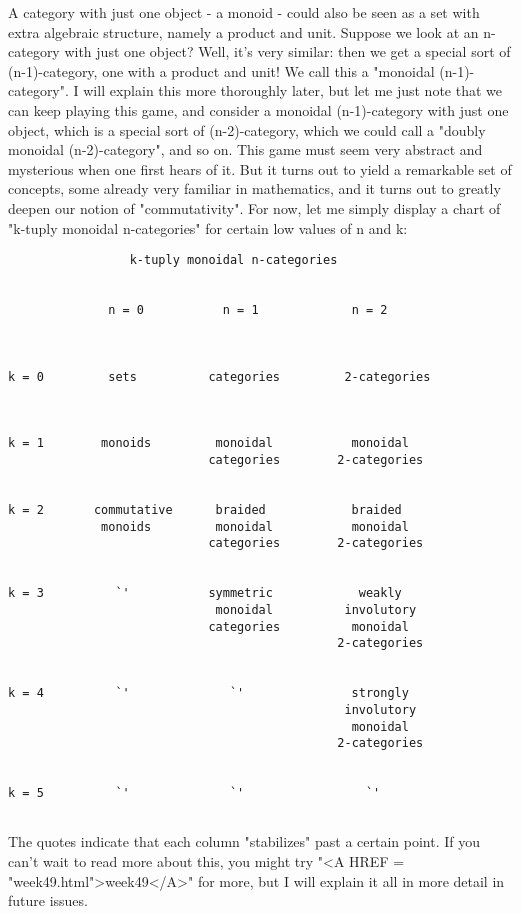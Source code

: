 A category with just one object - a monoid - could also be seen as a set
with extra algebraic structure, namely a product and unit.  Suppose we
look at an n-category with just one object?  Well, it's very similar:
then we get a special sort of (n-1)-category, one with a product and
unit!  We call this a "monoidal (n-1)-category".  I will
explain this more thoroughly later, but let me just note that we can
keep playing this game, and consider a monoidal (n-1)-category with just
one object, which is a special sort of (n-2)-category, which we could
call a "doubly monoidal (n-2)-category", and so on.  This game
must seem very abstract and mysterious when one first hears of it.  But
it turns out to yield a remarkable set of concepts, some already very
familiar in mathematics, and it turns out to greatly deepen our notion
of "commutativity".  For now, let me simply display a chart of
"k-tuply monoidal n-categories" for certain low values of n
and k:

\begin{verbatim}
                 k-tuply monoidal n-categories


              n = 0           n = 1             n = 2



k = 0         sets          categories         2-categories
     


k = 1        monoids         monoidal           monoidal
                            categories        2-categories


k = 2       commutative      braided            braided
             monoids         monoidal           monoidal
                            categories        2-categories 


k = 3          `'           symmetric            weakly
                             monoidal          involutory
                            categories          monoidal
                                              2-categories


k = 4          `'              `'               strongly 
                                               involutory
                                                monoidal
                                              2-categories


k = 5          `'              `'                 `'


\end{verbatim}
    
The quotes indicate that each column "stabilizes" past a certain
point.  If you can't wait to read more about this, you might try
"<A HREF = "week49.html">week49</A>" for more, but I will explain it all in more detail in future
issues.   

